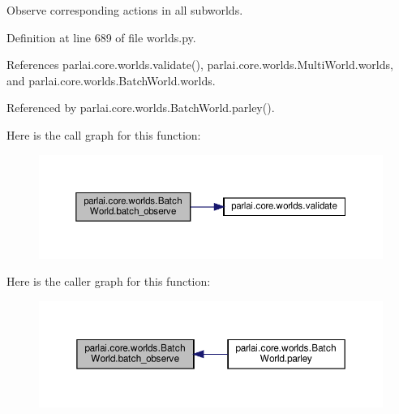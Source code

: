 \begin{DoxyVerb}Observe corresponding actions in all subworlds.\end{DoxyVerb}
 

Definition at line 689 of file worlds.\+py.



References parlai.\+core.\+worlds.\+validate(), parlai.\+core.\+worlds.\+Multi\+World.\+worlds, and parlai.\+core.\+worlds.\+Batch\+World.\+worlds.



Referenced by parlai.\+core.\+worlds.\+Batch\+World.\+parley().

Here is the call graph for this function\+:
\nopagebreak
\begin{figure}[H]
\begin{center}
\leavevmode
\includegraphics[width=350pt]{classparlai_1_1core_1_1worlds_1_1BatchWorld_a01faab842dc28b580dcaeacee491c5f5_cgraph}
\end{center}
\end{figure}
Here is the caller graph for this function\+:
\nopagebreak
\begin{figure}[H]
\begin{center}
\leavevmode
\includegraphics[width=350pt]{classparlai_1_1core_1_1worlds_1_1BatchWorld_a01faab842dc28b580dcaeacee491c5f5_icgraph}
\end{center}
\end{figure}
\mbox{\label{classparlai_1_1core_1_1worlds_1_1BatchWorld_a2b8dd323969084eedc03a7ab44647117}} 
